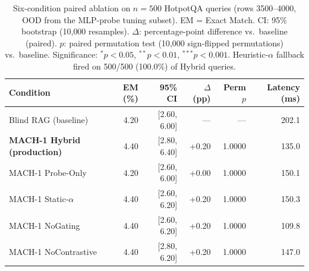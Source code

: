 \begin{table}[htbp]
\caption{Six-condition paired ablation on $n = 500$ HotpotQA queries (rows 3500--4000, OOD from the MLP-probe tuning subset). EM = Exact Match. CI: 95\% bootstrap (10{,}000 resamples). $\Delta$: percentage-point difference vs.\ baseline (paired). $p$: paired permutation test (10{,}000 sign-flipped permutations) vs.\ baseline. Significance: $^{\ast}p<0.05$, $^{\ast\ast}p<0.01$, $^{\ast\ast\ast}p<0.001$. Heuristic-$\alpha$ fallback fired on 500/500 (100.0\%) of Hybrid queries.}
\label{tab:ablation}
\centering
\renewcommand{\arraystretch}{1.15}
\begin{tabular}{l r r r r r}
\toprule
\textbf{Condition} & \textbf{EM (\%)} & \textbf{95\% CI} & \textbf{$\Delta$ (pp)} & \textbf{Perm $p$} & \textbf{Latency (ms)} \\
\midrule
Blind RAG (baseline) & 4.20 & [2.60, 6.00] & --- & --- & 202.1 \\
\textbf{MACH-1 Hybrid (production)} & 4.40 & [2.80, 6.40] & +0.20 & 1.0000 & 135.0 \\
MACH-1 Probe-Only & 4.20 & [2.60, 6.00] & +0.00 & 1.0000 & 150.1 \\
MACH-1 Static-$\alpha$ & 4.40 & [2.60, 6.20] & +0.20 & 1.0000 & 150.3 \\
MACH-1 NoGating & 4.40 & [2.60, 6.20] & +0.20 & 1.0000 & 109.8 \\
MACH-1 NoContrastive & 4.40 & [2.80, 6.20] & +0.20 & 1.0000 & 147.0 \\
\bottomrule
\end{tabular}
\end{table}
